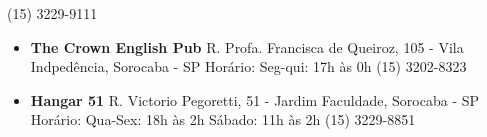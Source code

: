 \begin{multicols}{2}
\begin{itemize}
      \newline (15) 3229-9111
  \end{itemize}
  \begin{itemize}
    \item \textbf{The Crown English Pub}
      \newline R. Profa. Francisca de Queiroz, 105 - Vila Indpedência, Sorocaba - SP
      \newline Horário: Seg-qui: 17h às 0h
      \newline (15) 3202-8323
  \end{itemize}
  \begin{itemize}
    \item \textbf{Hangar 51}
      \newline R. Victorio Pegoretti, 51 - Jardim Faculdade, Sorocaba - SP
      \newline Horário: Qua-Sex: 18h às 2h
      \newline Sábado: 11h às 2h
      \newline (15) 3229-8851
  \end{itemize}
\end{multicols}
